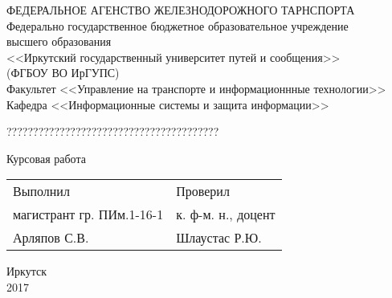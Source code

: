 \begin{titlepage}
	\newpage
	\begin{center}
		ФЕДЕРАЛЬНОЕ АГЕНСТВО ЖЕЛЕЗНОДОРОЖНОГО ТАРНСПОРТА \\
		\vspace{14pt}
		Федерально государственное бюджетное образовательное учреждение \\ высшего образования \\
		<<Иркутский государственный университет путей и сообщения>> \\
		(ФГБОУ ВО ИрГУПС) \\
		\vspace{28pt}
		Факультет <<Управление на транспорте и информационнные технологии>> \\
		Кафедра <<Информационные системы и защита информации>>
	\end{center}
	\vspace{28pt}
	\begin{center}
		????????????????????????????????????????
	\end{center}
	\vspace{-14pt}
	\begin{center}
		Курсовая работа \\
	\vspace{14pt}
		\mytitle
	\end{center}
	\vspace{56pt}
	\begin{flushleft}
		\begin{tabular}{p{}l}
			Выполнил					&  Проверил 			\\
			магистрант гр. ПИм.1-16-1	&  к. ф-м. н., доцент	\\
			Арляпов С.В.				&  Шлаустас Р.Ю.		\\
		\end{tabular}
	\end{flushleft}
	\vspace{\fill}
	\begin{center}
		Иркутск \\ 2017
	\end{center}
\end{titlepage}

